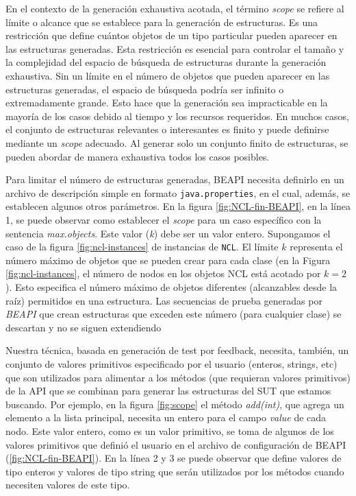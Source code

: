 En el contexto de la generación exhaustiva acotada, el término \emph{scope} se refiere al límite o alcance que se establece para la generación de estructuras. Es una restricción que define cuántos objetos de un tipo particular pueden aparecer en las estructuras generadas. Esta restricción es esencial para controlar el tamaño y la complejidad del espacio de búsqueda de estructuras durante la generación exhaustiva. Sin un límite en el número de objetos que pueden aparecer en las estructuras generadas, el espacio de búsqueda podría ser infinito o extremadamente grande. Esto hace que la generación sea impracticable en la mayoría de los casos debido al tiempo y los recursos requeridos.  En muchos casos, el conjunto de estructuras relevantes o interesantes es finito y puede definirse mediante un \emph{scope} adecuado. Al generar solo un conjunto finito de estructuras, se pueden abordar de manera exhaustiva todos los casos posibles.

Para limitar el número de estructuras generadas, BEAPI necesita definirlo en un archivo de descripción simple en formato \texttt{java.properties}, en el cual, además, se establecen algunos otros parámetros. En la figura \ref{fig:NCL-fin-BEAPI}, en la línea 1, se puede observar como establecer el \emph{scope} para un caso específico con la sentencia \emph{max.objects}. Este valor (\emph{k}) debe ser un valor entero. Supongamos el caso de la figura \ref{fig:ncl-instances} de instancias de \texttt{NCL}.  El límite $k$ representa el número máximo de objetos que se pueden crear para cada clase (en la Figura \ref{fig:ncl-instances}, el número de nodos en los objetos NCL está acotado por $k=2$). Esto especifica el número máximo de objetos diferentes (alcanzables desde la raíz) permitidos en una estructura. Las secuencias de prueba generadas por \emph{BEAPI} que crean estructuras que exceden este número (para cualquier clase) se descartan y no se siguen extendiendo

Nuestra técnica, basada en generación de test por feedback, necesita, también, un conjunto de valores primitivos especificado por el usuario (enteros, strings, etc) que son utilizados para alimentar a los métodos (que requieran valores primitivos) de la API que se combinan para generar las estructuras del SUT que estamos buscando.
Por ejemplo, en la figura \ref{fig:scope}  el método \emph{add(int)}, que agrega un elemento a la lista principal, necesita un entero para el campo \emph{value} de cada nodo. Este valor entero, como es un valor primitivo, se toma de algunos de los valores primitivos que definió el usuario en el archivo de configuración de BEAPI (\ref{fig:NCL-fin-BEAPI}). En la línea 2 y 3 se puede observar que define valores de tipo enteros y valores de tipo string que serán utilizados por los métodos cuando necesiten valores de este tipo. 

